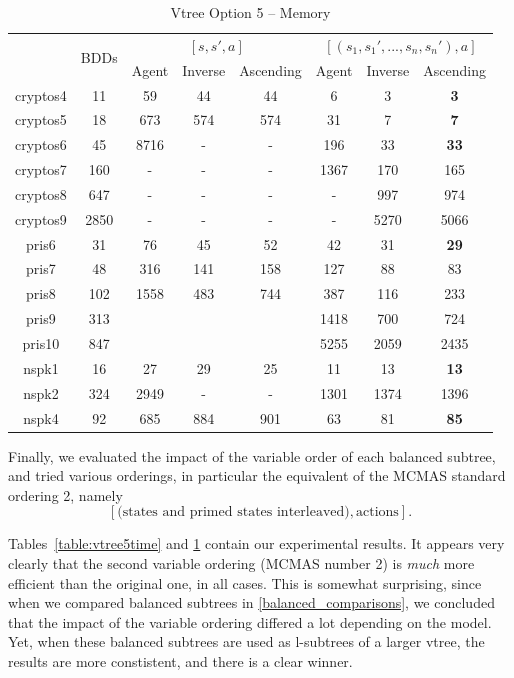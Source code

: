 \documentclass[11pt]{article}
\begin{document}
\begin{table}
\centering
\begin{tabular}{|*{8}{c|}}
\hline
& \multirow{2}{*}{BDDs} & \multicolumn{3}{c|}{$[s, s', a]$}& \multicolumn{3}{c|}{$[(s_1, s_1', ..., s_n, s_n'), a]$}\\ \cline{3-8}
& & Agent & Inverse & Ascending & Agent & Inverse & Ascending\\ \hline
cryptos4 & 11 & 59 & 44 & 44 & 6 & 3 &  \textbf{3}\\ \hline
cryptos5 & 18 & 673 & 574 & 574 &31 & 7 &  \textbf{7}\\ \hline
cryptos6 & 45 & 8716 & 
- & - & 196& 33 &  \textbf{33} \\ \hline
cryptos7 & 160 & - & - & - & 1367 & 170 & 165 \\ \hline
cryptos8 & 647 & - & - & - & - & 997 & 974\\ \hline
cryptos9 & 2850 & - & - & - & - & 5270 & 5066 \\ \hline
pris6 & 31 & 76 & 45 & 52 & 42&31&  \textbf{29}\\ \hline
pris7 & 48 & 316 & 141 & 158 & 127 &88 & 83\\ \hline
pris8 & 102 & 1558 & 483 & 744& 387 & 116 & 233\\ \hline
pris9 & 313 &  &  &  & 1418 & 700 & 724\\ \hline
pris10 & 847 &  &  &  & 5255 & 2059 & 2435\\ \hline
nspk1 & 16 & 27 & 29 & 25  & 11 & 13 &\textbf{13} \\ \hline
nspk2 & 324 & 2949 & - & - & 1301 & 1374 & 1396 \\ \hline
nspk4 & 92 & 685 & 884 & 901& 63&81&  \textbf{85}\\ \hline
\end{tabular}
\caption{Vtree Option 5 -- Memory}
\label{table:vtree5memory}
\end{table}


Finally, we evaluated the impact of the variable order of each balanced subtree, and tried various orderings, in particular the equivalent of the MCMAS standard ordering 2, namely $$[\mbox{(states and primed states interleaved)}, \mbox{actions}].$$

Tables~\ref{table:vtree5time} and \ref{table:vtree5memory} contain our experimental results. It appears very clearly that the second variable ordering (MCMAS number 2) is \textit{much }more efficient than the original one, in all cases. This is somewhat surprising, since when we compared balanced subtrees in \ref{balanced_comparisons}, we concluded that the impact of the variable ordering differed a lot depending on the model. Yet, when these balanced subtrees are used as l-subtrees of a larger vtree, the results are more constistent, and there is a clear winner.
\end{document}
